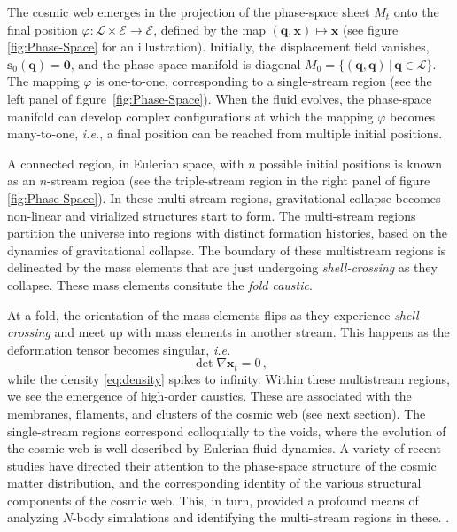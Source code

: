 \documentclass[a4paper, 11pt]{article}
\begin{document}
The cosmic web emerges in the projection of the phase-space sheet $M_t$ onto the final position $\varphi:\mathcal{L}\times \mathcal{E} \to \mathcal{E}$, defined by the map $(\bm{q},\bm{x}) \mapsto\bm{x}$ (see figure \ref{fig:Phase-Space} for an illustration). Initially, the displacement field vanishes, $\bm{s}_0(\bm{q})=\bm{0}$, and the phase-space manifold is diagonal $M_0=\{(\bm{q},\bm{q})\,|\,\bm{q} \in \mathcal{L}\}$. The mapping $\varphi$ is one-to-one, corresponding to a single-stream region (see the left panel of figure\ \ref{fig:Phase-Space}). When the fluid evolves, the phase-space manifold can develop complex configurations at which the mapping $\varphi$ becomes many-to-one, \textit{i.e.}, a final position can be reached from multiple initial positions.

A connected region, in Eulerian space, with $n$ possible initial positions is known as an $n$-stream region (see the triple-stream region in the right panel of figure \ref{fig:Phase-Space}). In these multi-stream regions, gravitational collapse becomes non-linear and virialized structures start to form. The multi-stream regions partition the universe into regions with distinct formation histories, based on the dynamics of gravitational collapse. The boundary of these multistream regions is delineated by the mass elements that are just undergoing
\textit{shell-crossing} as they collapse. These mass elements consitute the \textit{fold caustic}. 

At a fold, the orientation of the mass elements flips as they experience \textit{shell-crossing} and meet up with mass elements in
another stream. This happens as the deformation tensor becomes singular, \textit{i.e.}
\begin{equation}
  \det \nabla \bm{x}_t = 0 \,,
\end{equation}
\noindent while the density \eqref{eq:density} spikes to infinity. Within these multistream regions, we see the emergence of high-order caustics. These are associated with the membranes, filaments, and clusters of the cosmic web (see next section). The single-stream regions correspond colloquially to the voids, where the evolution of the cosmic web is well described by Eulerian fluid dynamics. A variety of recent studies have directed their attention to the phase-space structure of the cosmic matter distribution, and the corresponding identity of the various structural components of the cosmic web. This, in turn, provided a profound means of analyzing $N$-body simulations and identifying the multi-stream regions in these. \cite{Hahn:2007, Abel:2012, Shandarin:2012,  Feldbrugge:2014b, Ramachandra:2015, Ramachandra:2017, Shandarin:2019, Shandarin:2021}.
\end{document}

